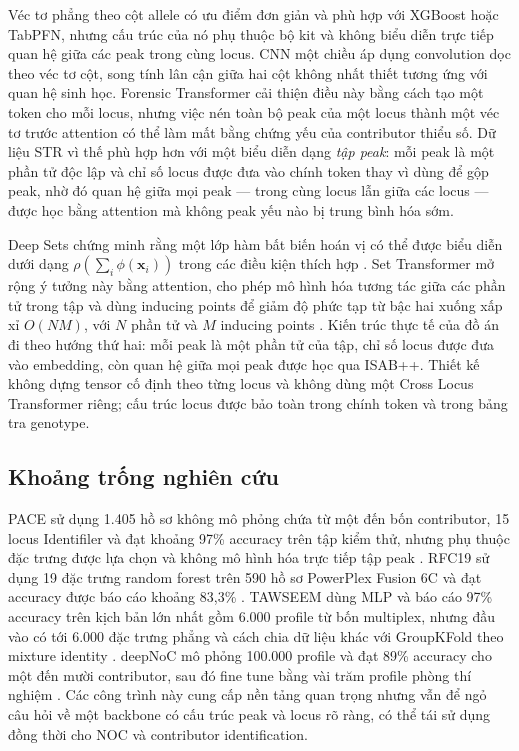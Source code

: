 \documentclass[12pt,a4paper]{article}
\begin{document}
Véc tơ phẳng theo cột allele có ưu điểm đơn giản và phù hợp với XGBoost hoặc TabPFN, nhưng cấu trúc của nó phụ thuộc bộ kit và không biểu diễn trực tiếp quan hệ giữa các peak trong cùng locus. CNN một chiều áp dụng convolution dọc theo véc tơ cột, song tính lân cận giữa hai cột không nhất thiết tương ứng với quan hệ sinh học. Forensic Transformer cải thiện điều này bằng cách tạo một token cho mỗi locus, nhưng việc nén toàn bộ peak của một locus thành một véc tơ trước attention có thể làm mất bằng chứng yếu của contributor thiểu số. Dữ liệu STR vì thế phù hợp hơn với một biểu diễn dạng \emph{tập peak}: mỗi peak là một phần tử độc lập và chỉ số locus được đưa vào chính token thay vì dùng để gộp peak, nhờ đó quan hệ giữa mọi peak — trong cùng locus lẫn giữa các locus — được học bằng attention mà không peak yếu nào bị trung bình hóa sớm.

Deep Sets chứng minh rằng một lớp hàm bất biến hoán vị có thể được biểu diễn dưới dạng \(\rho(\sum_i\phi(\bm{x}_i))\) trong các điều kiện thích hợp \cite{zaheer2017}. Set Transformer mở rộng ý tưởng này bằng attention, cho phép mô hình hóa tương tác giữa các phần tử trong tập và dùng inducing points để giảm độ phức tạp từ bậc hai xuống xấp xỉ \(O(NM)\), với \(N\) phần tử và \(M\) inducing points \cite{lee2019}. Kiến trúc thực tế của đồ án đi theo hướng thứ hai: mỗi peak là một phần tử của tập, chỉ số locus được đưa vào embedding, còn quan hệ giữa mọi peak được học qua ISAB++. Thiết kế không dựng tensor cố định theo từng locus và không dùng một Cross Locus Transformer riêng; cấu trúc locus được bảo toàn trong chính token và trong bảng tra genotype.

\subsection{Khoảng trống nghiên cứu}

PACE sử dụng 1.405 hồ sơ không mô phỏng chứa từ một đến bốn contributor, 15 locus Identifiler và đạt khoảng 97\% accuracy trên tập kiểm thử, nhưng phụ thuộc đặc trưng được lựa chọn và không mô hình hóa trực tiếp tập peak \cite{marciano2017,alamoudi2022}. RFC19 sử dụng 19 đặc trưng random forest trên 590 hồ sơ PowerPlex Fusion 6C và đạt accuracy được báo cáo khoảng 83,3\% \cite{benschop2019,kruijver2021}. TAWSEEM dùng MLP và báo cáo 97\% accuracy trên kịch bản lớn nhất gồm 6.000 profile từ bốn multiplex, nhưng đầu vào có tới 6.000 đặc trưng phẳng và cách chia dữ liệu khác với GroupKFold theo mixture identity \cite{alamoudi2022}. deepNoC mô phỏng 100.000 profile và đạt 89\% accuracy cho một đến mười contributor, sau đó fine tune bằng vài trăm profile phòng thí nghiệm \cite{taylor2024deepnoc}. Các công trình này cung cấp nền tảng quan trọng nhưng vẫn để ngỏ câu hỏi về một backbone có cấu trúc peak và locus rõ ràng, có thể tái sử dụng đồng thời cho NOC và contributor identification.
\end{document}
